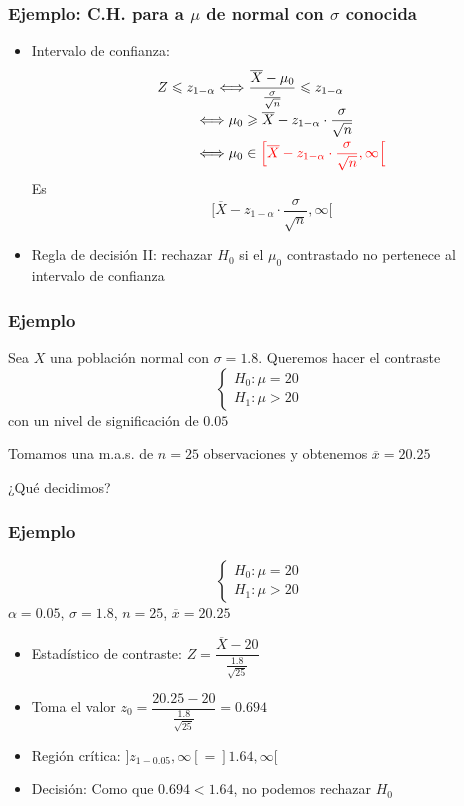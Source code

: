\documentclass[12pt,t]{beamer}\usepackage[]{graphicx}\usepackage[]{color}
\newcommand{\red}[1]{\textcolor{red}{#1}}
\renewcommand{\emph}[1]{{\color{red}#1}}
\renewcommand{\leq}{\leqslant}
\renewcommand{\geq}{\geqslant}
\theoremstyle{plain}
\theoremstyle{definition}
\begin{document}
\begin{frame}
\frametitle{Ejemplo: C.H. para a $\mu$ de normal con $\sigma$ conocida}

\begin{itemize}
\item \emph{Intervalo de confianza}: 
$$
\begin{array}{l}
\displaystyle Z\leq  z_{1-\alpha}\Longleftrightarrow  \dfrac{\overline{X}-\mu_{0}}{\frac{\sigma}{\sqrt{n}}}\leq  z_{1-\alpha} \\[2ex]
\displaystyle\qquad\quad\Longleftrightarrow  \mu_0\geq \overline{X}-z_{1-\alpha}\cdot\frac{\sigma}{\sqrt{n}}\\[2ex]
\displaystyle\qquad\quad\Longleftrightarrow \mu_0\in \red{\Big[\overline{X}-z_{1-\alpha}\cdot\frac{\sigma}{\sqrt{n}},\infty\Big[}
\end{array}
$$
Es
$$
\Big[\overline{X}-z_{1-\alpha}\cdot\frac{\sigma}{\sqrt{n}},\infty\Big[
$$
\medskip


\item \emph{Regla de decisión II}:
rechazar   $H_{0}$ si el $\mu_0$ contrastado no pertenece  al intervalo de confianza
\end{itemize}
\end{frame}


\begin{frame}
\frametitle{Ejemplo}
Sea $X$ una población normal con $\sigma=1.8$. Queremos hacer el contraste
$$
\left\{\begin{array}{l}
H_{0}:\mu=20\\ H_{1}:\mu>20
\end{array}
\right.
$$
con un nivel   de significación   de $0.05$
\medskip

Tomamos una m.a.s. de $n=25$ observaciones y obtenemos  $\overline{x}=20.25$
\medskip

¿Qué decidimos?
\end{frame}


\begin{frame}
\frametitle{Ejemplo}
$$
\left\{\begin{array}{l}
H_{0}:\mu=20\\ H_{1}:\mu>20
\end{array}
\right.
$$
$\alpha=0.05$, $\sigma=1.8$, $n=25$, $\overline{x}=20.25$
\medskip

\begin{itemize}
\item \emph{Estadístico de contraste}: $Z=
\dfrac{\overline{X}-20}{\frac{1.8}{\sqrt{25}}}$
\medskip

\item Toma el valor $z_0=\dfrac{20.25-20}{\frac{1.8}{\sqrt{25}}}=0.694$
\medskip

\item \emph{Región crítica}: $]z_{1-0.05},\infty[=]1.64,\infty[$
\medskip

\item \emph{Decisión}: Como que $0.694<1.64$, no podemos rechazar   $H_0$
\end{itemize}

\end{frame}
\end{document}
